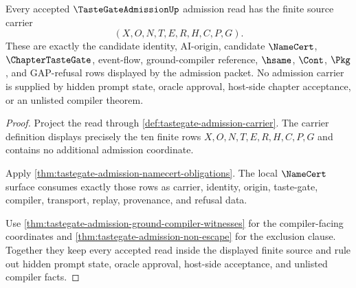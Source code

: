 \begin{theorem}
\label{thm:tastegate-admission-carrier-source-obligation}
Every accepted $\TasteGateAdmissionUp$ admission read has the finite source
carrier
$$
(X,O,N,T,E,R,H,C,P,G).
$$
These are exactly the candidate identity, AI-origin, candidate $\NameCert$,
$\ChapterTasteGate$, event-flow, ground-compiler reference, $\hsame$, $\Cont$,
$\Pkg$, and GAP-refusal rows displayed by the admission packet. No admission
carrier is supplied by hidden prompt state, oracle approval, host-side chapter
acceptance, or an unlisted compiler theorem.
\end{theorem}
\begin{proof}
Project the read through \autoref{def:tastegate-admission-carrier}. The carrier
definition displays precisely the ten finite rows
$X,O,N,T,E,R,H,C,P,G$ and contains no additional admission coordinate.

Apply \autoref{thm:tastegate-admission-namecert-obligations}. The local
$\NameCert$ surface consumes exactly those rows as carrier, identity, origin,
taste-gate, compiler, transport, replay, provenance, and refusal data.

Use \autoref{thm:tastegate-admission-ground-compiler-witnesses} for the
compiler-facing coordinates and \autoref{thm:tastegate-admission-non-escape}
for the exclusion clause. Together they keep every accepted read inside the
displayed finite source and rule out hidden prompt state, oracle approval,
host-side acceptance, and unlisted compiler facts.
\end{proof}

